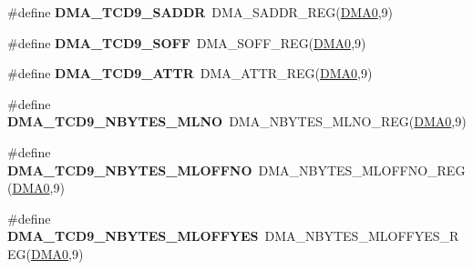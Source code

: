 \begin{DoxyCompactItemize}
\item 
\#define {\bfseries D\+M\+A\+\_\+\+T\+C\+D9\+\_\+\+S\+A\+D\+DR}~D\+M\+A\+\_\+\+S\+A\+D\+D\+R\+\_\+\+R\+EG(\hyperlink{group__DMA__Peripheral__Access__Layer_ga4103044f9ca209772f513dc694513ffb}{D\+M\+A0},9)\hypertarget{group__DMA__Register__Accessor__Macros_gabfaa87b6ce7fcca896ef0bea621484b0}{}\label{group__DMA__Register__Accessor__Macros_gabfaa87b6ce7fcca896ef0bea621484b0}

\item 
\#define {\bfseries D\+M\+A\+\_\+\+T\+C\+D9\+\_\+\+S\+O\+FF}~D\+M\+A\+\_\+\+S\+O\+F\+F\+\_\+\+R\+EG(\hyperlink{group__DMA__Peripheral__Access__Layer_ga4103044f9ca209772f513dc694513ffb}{D\+M\+A0},9)\hypertarget{group__DMA__Register__Accessor__Macros_ga9fa3ee648910ce0b3f958f9fba8109bd}{}\label{group__DMA__Register__Accessor__Macros_ga9fa3ee648910ce0b3f958f9fba8109bd}

\item 
\#define {\bfseries D\+M\+A\+\_\+\+T\+C\+D9\+\_\+\+A\+T\+TR}~D\+M\+A\+\_\+\+A\+T\+T\+R\+\_\+\+R\+EG(\hyperlink{group__DMA__Peripheral__Access__Layer_ga4103044f9ca209772f513dc694513ffb}{D\+M\+A0},9)\hypertarget{group__DMA__Register__Accessor__Macros_gab5bfe174e41a010fa81140945c342ef9}{}\label{group__DMA__Register__Accessor__Macros_gab5bfe174e41a010fa81140945c342ef9}

\item 
\#define {\bfseries D\+M\+A\+\_\+\+T\+C\+D9\+\_\+\+N\+B\+Y\+T\+E\+S\+\_\+\+M\+L\+NO}~D\+M\+A\+\_\+\+N\+B\+Y\+T\+E\+S\+\_\+\+M\+L\+N\+O\+\_\+\+R\+EG(\hyperlink{group__DMA__Peripheral__Access__Layer_ga4103044f9ca209772f513dc694513ffb}{D\+M\+A0},9)\hypertarget{group__DMA__Register__Accessor__Macros_ga2e2580532266e2bfb8626521ed50bf5d}{}\label{group__DMA__Register__Accessor__Macros_ga2e2580532266e2bfb8626521ed50bf5d}

\item 
\#define {\bfseries D\+M\+A\+\_\+\+T\+C\+D9\+\_\+\+N\+B\+Y\+T\+E\+S\+\_\+\+M\+L\+O\+F\+F\+NO}~D\+M\+A\+\_\+\+N\+B\+Y\+T\+E\+S\+\_\+\+M\+L\+O\+F\+F\+N\+O\+\_\+\+R\+EG(\hyperlink{group__DMA__Peripheral__Access__Layer_ga4103044f9ca209772f513dc694513ffb}{D\+M\+A0},9)\hypertarget{group__DMA__Register__Accessor__Macros_gab692893ea10469e543391d042aad45e1}{}\label{group__DMA__Register__Accessor__Macros_gab692893ea10469e543391d042aad45e1}

\item 
\#define {\bfseries D\+M\+A\+\_\+\+T\+C\+D9\+\_\+\+N\+B\+Y\+T\+E\+S\+\_\+\+M\+L\+O\+F\+F\+Y\+ES}~D\+M\+A\+\_\+\+N\+B\+Y\+T\+E\+S\+\_\+\+M\+L\+O\+F\+F\+Y\+E\+S\+\_\+\+R\+EG(\hyperlink{group__DMA__Peripheral__Access__Layer_ga4103044f9ca209772f513dc694513ffb}{D\+M\+A0},9)\hypertarget{group__DMA__Register__Accessor__Macros_ga1a9eab72523f41a399f2f7201429d28d}{}\label{group__DMA__Register__Accessor__Macros_ga1a9eab72523f41a399f2f7201429d28d}


\end{DoxyCompactItemize}

